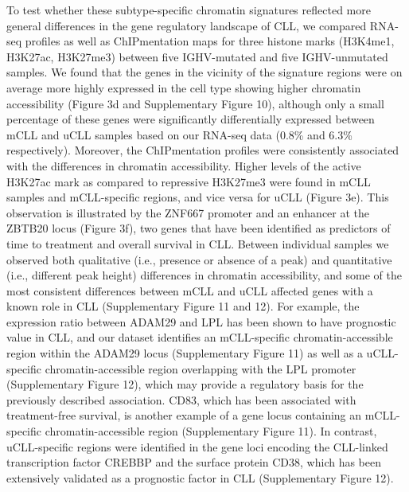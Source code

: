 \documentclass[10pt,]{article}
\begin{document}
To test whether these subtype-specific chromatin signatures reflected
more general differences in the gene regulatory landscape of CLL, we
compared RNA-seq profiles as well as ChIPmentation maps for three
histone marks (H3K4me1, H3K27ac, H3K27me3) between five IGHV-mutated and
five IGHV-unmutated samples. We found that the genes in the vicinity of
the signature regions were on average more highly expressed in the cell
type showing higher chromatin accessibility (Figure 3d and Supplementary
Figure 10), although only a small percentage of these genes were
significantly differentially expressed between mCLL and uCLL samples
based on our RNA-seq data (0.8\% and 6.3\% respectively). Moreover, the
ChIPmentation profiles were consistently associated with the differences
in chromatin accessibility. Higher levels of the active H3K27ac mark as
compared to repressive H3K27me3 were found in mCLL samples and
mCLL-specific regions, and vice versa for uCLL (Figure 3e). This
observation is illustrated by the ZNF667 promoter and an enhancer at the
ZBTB20 locus (Figure 3f), two genes that have been identified as
predictors of time to treatment and overall survival in
CLL\citep{Morabito2015, Nikitin2007}. Between individual samples we
observed both qualitative (i.e., presence or absence of a peak) and
quantitative (i.e., different peak height) differences in chromatin
accessibility, and some of the most consistent differences between mCLL
and uCLL affected genes with a known role in CLL (Supplementary Figure
11 and 12). For example, the expression ratio between ADAM29 and LPL has
been shown to have prognostic value in CLL\citep{Oppezzo2005}, and our
dataset identifies an mCLL-specific chromatin-accessible region within
the ADAM29 locus (Supplementary Figure 11) as well as a uCLL-specific
chromatin-accessible region overlapping with the LPL promoter
(Supplementary Figure 12), which may provide a regulatory basis for the
previously described association. CD83, which has been associated with
treatment-free survival\citep{Hock2009}, is another example of a gene
locus containing an mCLL-specific chromatin-accessible region
(Supplementary Figure 11). In contrast, uCLL-specific regions were
identified in the gene loci encoding the CLL-linked transcription factor
CREBBP\citep{Puente2015} and the surface protein CD38, which has been
extensively validated as a prognostic factor in CLL\citep{Malavasi2011}
(Supplementary Figure 12).
\end{document}
